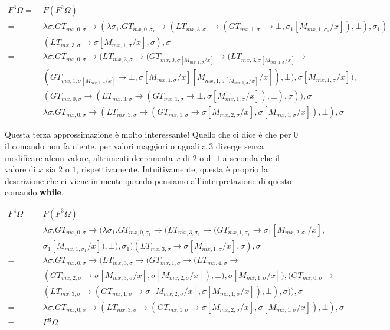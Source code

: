     \begin{align*}
        F^3\Omega =\;& F(F^2\Omega)\\
        =\;& \lambda\sigma. GT_{mx,0,\sigma} \rightarrow (\lambda\sigma_1. GT_{mx,0,\sigma_1} \rightarrow (LT_{mx,3,\sigma_1}\rightarrow (GT_{mx,1,\sigma_1} \rightarrow \bot, \sigma_1[M_{mx,1,\sigma_1}/x]), \bot), \sigma_1)\\
        &(LT_{mx,3,\sigma}\rightarrow \sigma[M_{mx,1,\sigma}/x], \sigma), \sigma\\
        =\;& \lambda\sigma. GT_{mx,0,\sigma} \rightarrow (LT_{mx,3,\sigma}\rightarrow (GT_{mx,0,\sigma[M_{mx,1,\sigma}/x]} \rightarrow (LT_{mx,3,\sigma[M_{mx,1,\sigma}/x]}\rightarrow\\
        &(GT_{mx,1,\sigma[M_{mx,1,\sigma}/x]} \rightarrow \bot, \sigma[M_{mx,1,\sigma}/x][M_{mx,1,\sigma[M_{mx,1,\sigma}/x]}/x]), \bot), \sigma[M_{mx,1,\sigma}/x]),\\
        &(GT_{mx,0,\sigma} \rightarrow (LT_{mx,3,\sigma}\rightarrow (GT_{mx,1,\sigma} \rightarrow \bot, \sigma[M_{mx,1,\sigma}/x]), \bot), \sigma)), \sigma\\
        =\;& \lambda\sigma. GT_{mx,0,\sigma} \rightarrow (LT_{mx,3,\sigma}\rightarrow (GT_{mx,1,\sigma} \rightarrow \sigma[M_{mx,2,\sigma}/x], \sigma[M_{mx,1,\sigma}/x]), \bot), \sigma
    \end{align*}
    
    Questa terza approssimazione è molto interessante! Quello che ci dice è che per $0$ il comando non fa niente, per valori maggiori o uguali a $3$ diverge senza modificare alcun valore, altrimenti decrementa $x$ di $2$ o di $1$ a seconda che il valore di $x$ sia $2$ o $1$, rispettivamente. Intuitivamente, questa è proprio la descrizione che ci viene in mente quando pensiamo all'interpretazione di questo comando \textbf{while}.
    
    \begin{align*}
        F^4\Omega =\;& F(F^3\Omega)\\
        =\;& \lambda\sigma. GT_{mx,0,\sigma} \rightarrow (\lambda\sigma_1. GT_{mx,0,\sigma_1} \rightarrow (LT_{mx,3,\sigma_1}\rightarrow (GT_{mx,1,\sigma_1} \rightarrow \sigma_1[M_{mx,2,\sigma_1}/x],\\
        &\sigma_1[M_{mx,1,\sigma_1}/x]), \bot), \sigma_1)(LT_{mx,3,\sigma}\rightarrow \sigma[M_{mx,1,\sigma}/x], \sigma), \sigma\\
        =\;& \lambda\sigma. GT_{mx,0,\sigma} \rightarrow (LT_{mx,3,\sigma}\rightarrow (GT_{mx,1,\sigma} \rightarrow (LT_{mx,4,\sigma}\rightarrow\\
        &(GT_{mx,2,\sigma} \rightarrow \sigma[M_{mx,3,\sigma}/x],\sigma[M_{mx,2,\sigma}/x]), \bot), \sigma[M_{mx,1,\sigma}/x]),(GT_{mx,0,\sigma} \rightarrow\\
        &(LT_{mx,3,\sigma}\rightarrow (GT_{mx,1,\sigma} \rightarrow \sigma[M_{mx,2,\sigma}/x],\sigma[M_{mx,1,\sigma}/x]), \bot), \sigma)), \sigma\\
        =\;& \lambda\sigma. GT_{mx,0,\sigma} \rightarrow (LT_{mx,3,\sigma}\rightarrow (GT_{mx,1,\sigma} \rightarrow \sigma[M_{mx,2,\sigma}/x], \sigma[M_{mx,1,\sigma}/x]), \bot), \sigma\\
        =\;& F^3\Omega
    \end{align*}
    
